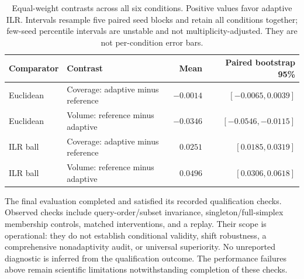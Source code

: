 \documentclass{article}
\begin{document}
\begin{table}[t]
\centering\small
\begin{tabular}{llrr}
\toprule
Comparator & Contrast & Mean & Paired bootstrap 95\% \\
\midrule
Euclidean & Coverage: adaptive minus reference & $-0.0014$ & $[-0.0065,0.0039]$ \\
Euclidean & Volume: reference minus adaptive & $-0.0346$ & $[-0.0546,-0.0115]$ \\
ILR ball & Coverage: adaptive minus reference & $0.0251$ & $[0.0185,0.0319]$ \\
ILR ball & Volume: reference minus adaptive & $0.0496$ & $[0.0306,0.0618]$ \\
\bottomrule
\end{tabular}
\caption{Equal-weight contrasts across all six conditions. Positive values favor adaptive ILR. Intervals resample five paired seed blocks and retain all conditions together; few-seed percentile intervals are unstable and not multiplicity-adjusted. They are not per-condition error bars.}
\label{tab:contrasts}
\end{table}

The final evaluation completed and satisfied its recorded qualification checks. Observed checks include query-order/subset invariance, singleton/full-simplex membership controls, matched interventions, and a replay. Their scope is operational: they do not establish conditional validity, shift robustness, a comprehensive nonadaptivity audit, or universal superiority. No unreported diagnostic is inferred from the qualification outcome. The performance failures above remain scientific limitations notwithstanding completion of these checks.
\end{document}
